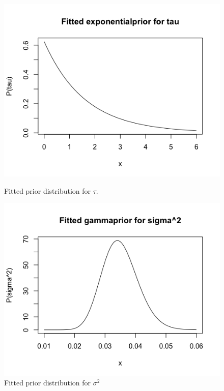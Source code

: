\begin{figure}[p] 
	\includegraphics[width=1\linewidth]{figurer/fitted_exponential.png}
     \caption{Fitted prior distribution for $\tau$.}
     \label{fittedexponential}
	\endminipage\hfill
  \includegraphics[width=1\linewidth]{figurer/fitted_gamma.png}
	 \caption{Fitted prior distribution for $\sigma^2$}
	 \label{fittedgamma}
\endminipage
\end{figure}

